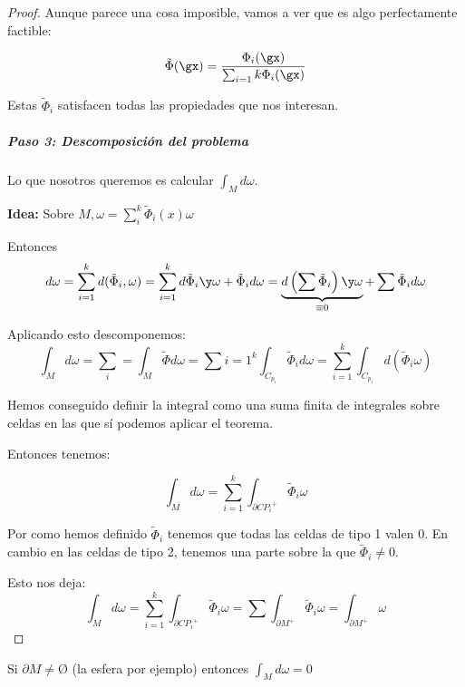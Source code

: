 \begin{proof}
Aunque parece una cosa imposible, vamos a ver que es algo perfectamente factible:

\[\tilde{\Phi}(\gx) = \frac{\Phi_i (\gx)}{\sum_{i=1}{k}\Phi_i(\gx)}\]

Estas $\tilde{\Phi}_i$ satisfacen todas las propiedades que nos interesan.

\subparagraph{Paso 3: Descomposición del problema}

Lo que nosotros queremos es calcular $\int_M d\omega$.


\textbf{Idea:} Sobre $M, \omega=\sum_i^k\tilde{\Phi}_i(x)\omega$

Entonces \[d\omega = \sum_{i=1}^k d(\tilde{\Phi}_i,\omega) = \sum_{i=1}^k d\tilde{\Phi}_i\y \omega + \tilde{\Phi}_i d\omega = \underbrace{d\left(\sum \tilde{\Phi}_i\right) \y \omega}_{\equiv 0} + \sum \tilde{\Phi}_id\omega\]

Aplicando esto descomponemos:
\[\int_M d\omega = \sum_i = \int_M \tilde{\Phi}d\omega = \sum{i=1}^k \int_{C_{p_i}} \tilde{\Phi}_id\omega=\sum_{i=1}^k \int_{C_{p_i}} d(\tilde{\Phi}_i\omega)
\]

Hemos conseguido definir la integral como una suma finita de integrales sobre celdas en las que sí podemos aplicar el teorema.

Entonces tenemos:

\[\int_M d\omega = \sum_{i=1}^k \int_{\partial  C{P_i}^{+}} \tilde{\Phi}_i\omega\]


Por como hemos definido $\tilde{\Phi}_i$ tenemos que todas las celdas de tipo 1 valen 0. En cambio en las celdas de tipo 2, tenemos una parte sobre la que $\tilde{\Phi}_i \neq 0$.

Esto nos deja: \[\int_M d\omega = \sum_{i=1}^k \int_{\partial  C{P_i}^{+}} \tilde{\Phi}_i\omega = \sum \int_{\partial M^+} \tilde{\Phi}_i \omega = \int_{\partial M^+} \omega\]

\end{proof}

\obs Si $\partial M \neq Ø$ (la esfera por ejemplo) entonces $\int_{M} d\omega =0$



